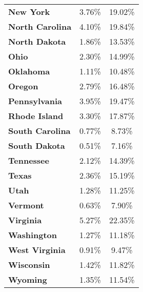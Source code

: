 \begin{ThreePartTable}
\begin{longtable}[t]{>{}lcc}
\textbf{New York} & 3.76\% & 19.02\%\\
\textbf{North Carolina} & 4.10\% & 19.84\%\\
\textbf{North Dakota} & 1.86\% & 13.53\%\\
\addlinespace
\textbf{Ohio} & 2.30\% & 14.99\%\\
\textbf{Oklahoma} & 1.11\% & 10.48\%\\
\textbf{Oregon} & 2.79\% & 16.48\%\\
\textbf{Pennsylvania} & 3.95\% & 19.47\%\\
\textbf{Rhode Island} & 3.30\% & 17.87\%\\
\addlinespace
\textbf{South Carolina} & 0.77\% & 8.73\%\\
\textbf{South Dakota} & 0.51\% & 7.16\%\\
\textbf{Tennessee} & 2.12\% & 14.39\%\\
\textbf{Texas} & 2.36\% & 15.19\%\\
\textbf{Utah} & 1.28\% & 11.25\%\\
\addlinespace
\textbf{Vermont} & 0.63\% & 7.90\%\\
\textbf{Virginia} & 5.27\% & 22.35\%\\
\textbf{Washington} & 1.27\% & 11.18\%\\
\textbf{West Virginia} & 0.91\% & 9.47\%\\
\textbf{Wisconsin} & 1.42\% & 11.82\%\\
\addlinespace
\textbf{Wyoming} & 1.35\% & 11.54\%\\*
\end{longtable}
\end{ThreePartTable}
